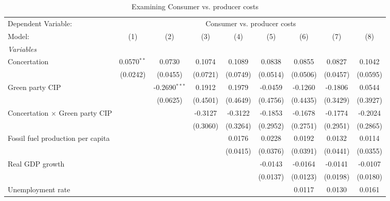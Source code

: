 
\begin{table}[htbp]
   \caption{Examining Consumer vs. producer costs}
   \centering
   \begin{tabular}{lcccccccc}
      \tabularnewline \midrule \midrule
      Dependent Variable: & \multicolumn{8}{c}{Consumer vs. producer costs}\\
      Model:                                  & (1)           & (2)             & (3)      & (4)      & (5)      & (6)      & (7)      & (8)\\  
      \midrule
      \emph{Variables}\\
      Concertation                            & 0.0570$^{**}$ & 0.0730          & 0.1074   & 0.1089   & 0.0838   & 0.0855   & 0.0827   & 0.1042\\   
                                              & (0.0242)      & (0.0455)        & (0.0721) & (0.0749) & (0.0514) & (0.0506) & (0.0457) & (0.0595)\\   
      Green party CIP                         &               & -0.2690$^{***}$ & 0.1912   & 0.1979   & -0.0459  & -0.1260  & -0.1806  & 0.0544\\   
                                              &               & (0.0625)        & (0.4501) & (0.4649) & (0.4756) & (0.4435) & (0.3429) & (0.3927)\\   
      Concertation $\times$ Green party CIP   &               &                 & -0.3127  & -0.3122  & -0.1853  & -0.1678  & -0.1774  & -0.2024\\   
                                              &               &                 & (0.3060) & (0.3264) & (0.2952) & (0.2751) & (0.2951) & (0.2865)\\   
      Fossil fuel production per capita       &               &                 &          & 0.0176   & 0.0228   & 0.0192   & 0.0132   & 0.0114\\   
                                              &               &                 &          & (0.0415) & (0.0376) & (0.0391) & (0.0441) & (0.0355)\\   
      Real GDP growth                         &               &                 &          &          & -0.0143  & -0.0164  & -0.0141  & -0.0107\\   
                                              &               &                 &          &          & (0.0137) & (0.0123) & (0.0198) & (0.0180)\\   
      Unemployment rate                       &               &                 &          &          &          & 0.0117   & 0.0130   & 0.0161\\   

\end{tabular}
\end{table}
